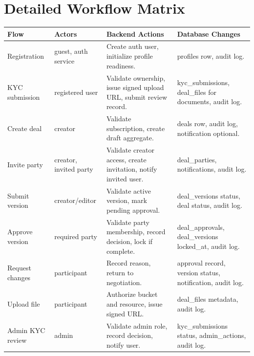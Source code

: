 \section{Detailed Workflow Matrix}
\begin{longtable}{p{}p{}p{}p{}}
\toprule
Flow & Actors & Backend Actions & Database Changes \\
\midrule
Registration & guest, auth service & Create auth user, initialize profile readiness. & profiles row, audit log. \\
KYC submission & registered user & Validate ownership, issue signed upload URL, submit review record. & kyc\_submissions, deal\_files for documents, audit log. \\
Create deal & creator & Validate subscription, create draft aggregate. & deals row, audit log, notification optional. \\
Invite party & creator, invited party & Validate creator access, create invitation, notify invited user. & deal\_parties, notifications, audit log. \\
Submit version & creator/editor & Validate active version, mark pending approval. & deal\_versions status, deal status, audit log. \\
Approve version & required party & Validate party membership, record decision, lock if complete. & deal\_approvals, deal\_versions locked\_at, audit log. \\
Request changes & participant & Record reason, return to negotiation. & approval record, version status, notification, audit log. \\
Upload file & participant & Authorize bucket and resource, issue signed URL. & deal\_files metadata, audit log. \\
Admin KYC review & admin & Validate admin role, record decision, notify user. & kyc\_submissions status, admin\_actions, audit log. \\
\bottomrule
\end{longtable}

